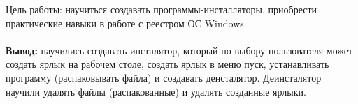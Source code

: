 

Цель работы:
научиться создавать программы-инсталляторы, приобрести практические навыки в работе с реестром ОС Windows.





\paragraph{} \hspace{0pt}

\textbf{Вывод:} научились создавать инсталятор, который по выбору пользователя может создать ярлык на рабочем столе,
создать ярлык в меню пуск, устанавливать программу (распаковывать файла) и создавать денсталятор.
Деинсталятор научили удалять файлы (распакованные) и удалять созданные ярлыки.
